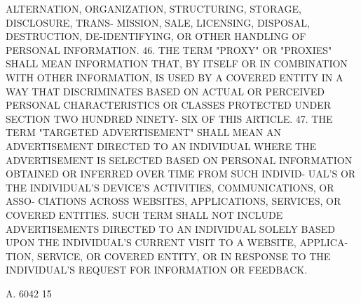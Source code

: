  ALTERNATION,  ORGANIZATION,  STRUCTURING,  STORAGE,  DISCLOSURE,  TRANS-
 MISSION, SALE,  LICENSING,  DISPOSAL,  DESTRUCTION,  DE-IDENTIFYING,  OR
 OTHER HANDLING OF PERSONAL INFORMATION.
   46.  THE  TERM  "PROXY"  OR  "PROXIES" SHALL MEAN INFORMATION THAT, BY
 ITSELF OR IN COMBINATION WITH OTHER INFORMATION, IS USED  BY  A  COVERED
 ENTITY IN A WAY THAT DISCRIMINATES BASED ON ACTUAL OR PERCEIVED PERSONAL
 CHARACTERISTICS  OR  CLASSES PROTECTED UNDER SECTION TWO HUNDRED NINETY-
 SIX OF THIS ARTICLE.
   47. THE TERM "TARGETED  ADVERTISEMENT"  SHALL  MEAN  AN  ADVERTISEMENT
 DIRECTED  TO  AN INDIVIDUAL WHERE THE ADVERTISEMENT IS SELECTED BASED ON
 PERSONAL INFORMATION OBTAINED OR INFERRED OVER TIME FROM  SUCH  INDIVID-
 UAL'S  OR THE INDIVIDUAL'S DEVICE'S ACTIVITIES, COMMUNICATIONS, OR ASSO-
 CIATIONS ACROSS WEBSITES, APPLICATIONS, SERVICES, OR  COVERED  ENTITIES.
 SUCH  TERM  SHALL  NOT  INCLUDE ADVERTISEMENTS DIRECTED TO AN INDIVIDUAL
 SOLELY BASED UPON THE INDIVIDUAL'S CURRENT VISIT TO A WEBSITE,  APPLICA-
 TION,  SERVICE,  OR  COVERED  ENTITY, OR IN RESPONSE TO THE INDIVIDUAL'S
 REQUEST FOR INFORMATION OR FEEDBACK.

 A. 6042                            15
 
